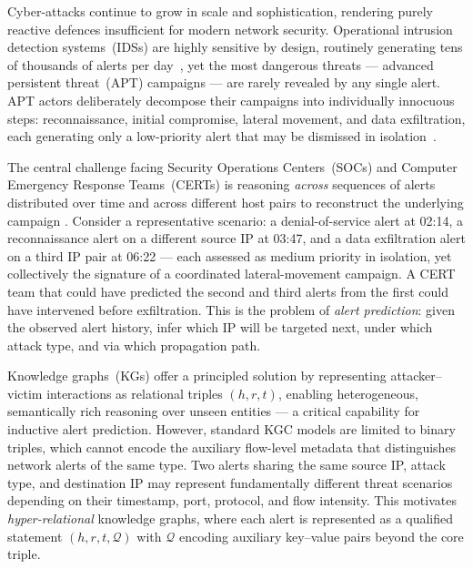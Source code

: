 \documentclass[10pt,journal,compsoc]{IEEEtran}
\begin{document}
\IEEEdisplaynontitleabstractindextext

\IEEEpeerreviewmaketitle


Cyber-attacks continue to grow in scale and
sophistication, rendering purely reactive defences
insufficient for modern network security.
Operational intrusion detection systems~(IDSs) are
highly sensitive by design, routinely generating
tens of thousands of alerts per day~\cite{husak2021predictive},
yet the most dangerous threats --- advanced persistent
threat~(APT) campaigns --- are rarely revealed by
any single alert. APT actors deliberately decompose
their campaigns into individually innocuous steps:
reconnaissance, initial compromise, lateral movement,
and data exfiltration, each generating only a
low-priority alert that may be dismissed in
isolation~\cite{husak2021predictive}.

The central challenge facing Security Operations
Centers~(SOCs) and Computer Emergency Response
Teams~(CERTs) is reasoning \emph{across} sequences
of alerts distributed over time and across different
host pairs to reconstruct the underlying campaign \cite{9684707}.
Consider a representative scenario: a denial-of-service
alert at 02:14, a reconnaissance alert on a different
source IP at 03:47, and a data exfiltration alert on a
third IP pair at 06:22 --- each assessed as medium
priority in isolation, yet collectively the signature
of a coordinated lateral-movement campaign. A CERT
team that could have predicted the second and third
alerts from the first could have intervened before
exfiltration. This is the problem of \emph{alert
prediction}: given the observed alert history, infer
which IP will be targeted next, under which attack
type, and via which propagation path.

Knowledge graphs~(KGs) offer a principled solution
by representing attacker--victim interactions as
relational triples $(h, r, t)$, enabling heterogeneous,
semantically rich reasoning over unseen entities ---
a critical capability for inductive alert prediction.
However, standard KGC models are limited to binary
triples, which cannot encode the auxiliary flow-level
metadata that distinguishes network alerts of the
same type. Two alerts sharing the same source IP,
attack type, and destination IP may represent
fundamentally different threat scenarios depending
on their timestamp, port, protocol, and flow
intensity. This motivates \emph{hyper-relational}
knowledge graphs, where each alert is represented
as a qualified statement $(h, r, t, \mathcal{Q})$
with $\mathcal{Q}$ encoding auxiliary key--value
pairs beyond the core triple.
\end{document}
